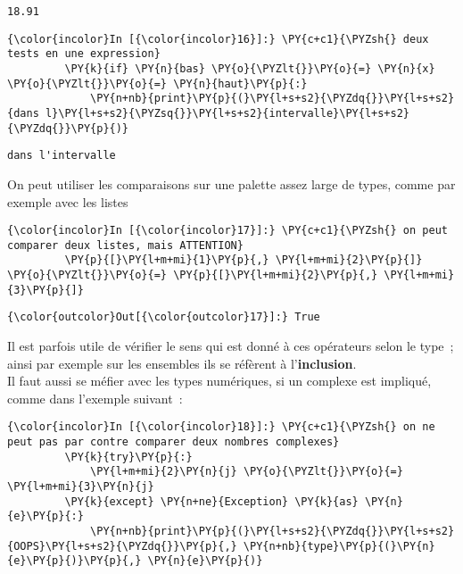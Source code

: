     \begin{Verbatim}[commandchars=\\\{\}]
18.91

    \end{Verbatim}

    \begin{Verbatim}[commandchars=\\\{\}]
{\color{incolor}In [{\color{incolor}16}]:} \PY{c+c1}{\PYZsh{} deux tests en une expression}
         \PY{k}{if} \PY{n}{bas} \PY{o}{\PYZlt{}}\PY{o}{=} \PY{n}{x} \PY{o}{\PYZlt{}}\PY{o}{=} \PY{n}{haut}\PY{p}{:}
             \PY{n+nb}{print}\PY{p}{(}\PY{l+s+s2}{\PYZdq{}}\PY{l+s+s2}{dans l}\PY{l+s+s2}{\PYZsq{}}\PY{l+s+s2}{intervalle}\PY{l+s+s2}{\PYZdq{}}\PY{p}{)}
\end{Verbatim}


    \begin{Verbatim}[commandchars=\\\{\}]
dans l'intervalle

    \end{Verbatim}

    On peut utiliser les comparaisons sur une palette assez large de types,
comme par exemple avec les listes

    \begin{Verbatim}[commandchars=\\\{\}]
{\color{incolor}In [{\color{incolor}17}]:} \PY{c+c1}{\PYZsh{} on peut comparer deux listes, mais ATTENTION}
         \PY{p}{[}\PY{l+m+mi}{1}\PY{p}{,} \PY{l+m+mi}{2}\PY{p}{]} \PY{o}{\PYZlt{}}\PY{o}{=} \PY{p}{[}\PY{l+m+mi}{2}\PY{p}{,} \PY{l+m+mi}{3}\PY{p}{]}
\end{Verbatim}


\begin{Verbatim}[commandchars=\\\{\}]
{\color{outcolor}Out[{\color{outcolor}17}]:} True
\end{Verbatim}
            
    Il est parfois utile de vérifier le sens qui est donné à ces opérateurs
selon le type~; ainsi par exemple sur les ensembles ils se réfèrent à
l'\textbf{inclusion}.\\

Il faut aussi se méfier avec les types numériques, si un complexe est
impliqué, comme dans l'exemple suivant~:

    \begin{Verbatim}[commandchars=\\\{\}]
{\color{incolor}In [{\color{incolor}18}]:} \PY{c+c1}{\PYZsh{} on ne peut pas par contre comparer deux nombres complexes}
         \PY{k}{try}\PY{p}{:}
             \PY{l+m+mi}{2}\PY{n}{j} \PY{o}{\PYZlt{}}\PY{o}{=} \PY{l+m+mi}{3}\PY{n}{j}
         \PY{k}{except} \PY{n+ne}{Exception} \PY{k}{as} \PY{n}{e}\PY{p}{:}
             \PY{n+nb}{print}\PY{p}{(}\PY{l+s+s2}{\PYZdq{}}\PY{l+s+s2}{OOPS}\PY{l+s+s2}{\PYZdq{}}\PY{p}{,} \PY{n+nb}{type}\PY{p}{(}\PY{n}{e}\PY{p}{)}\PY{p}{,} \PY{n}{e}\PY{p}{)}
\end{Verbatim}


